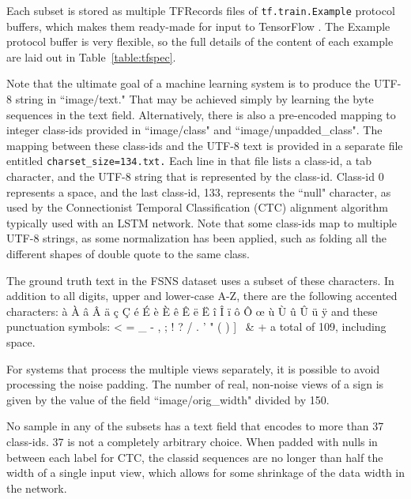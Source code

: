 \documentclass[runningheads]{llncs}
\begin{document}
Each subset is stored as multiple TFRecords files of \texttt{tf.train.Example} protocol buffers, which makes them ready-made
 for input to TensorFlow \cite{tensorflow}\cite{abadi2016tensorflow}.
 The Example protocol buffer is very flexible, so the full details of the content of each example are laid
 out in Table~\ref{table:tfspec}.

Note that the ultimate goal of a machine learning system is to produce the UTF-8 string in ``image/text."
 That may be achieved simply by learning the byte sequences in the text field. Alternatively, there is also a
 pre-encoded mapping to integer class-ids provided in ``image/class" and ``image/unpadded\_class".
 The mapping between these class-ids and the UTF-8 text is provided in a separate file entitled
 \texttt{charset\_size=134.txt.} Each line in that file lists a class-id, a tab character, and the UTF-8 string
 that is represented by the class-id. Class-id 0 represents a space, and the last class-id, 133,
 represents the ``null" character, as used by the Connectionist Temporal Classification (CTC) alignment
 algorithm \cite{graves2006connectionist} typically used with an LSTM network. Note that some
 class-ids map to multiple UTF-8 strings, as some normalization has been applied, such as folding all the different shapes of double quote to the same class.

The ground truth text in the FSNS dataset uses a subset of these characters. In addition to all digits,
upper and lower-case A-Z, there are the following accented characters:
à
À
â
Â
ä
ç
Ç
é
É
è
È
ê
Ê
ë
Ë
î
Î
ï
ô
Ô
œ
ù
Ù
û
Û
ü
ÿ
and these punctuation symbols:
\textless
=
\_
-
,
;
!
?
/
.
'
"
(
)
]
\
\&
+
 a total of 109, including space.

For systems that process the multiple views separately, it is possible to avoid processing the noise padding. The number of real, non-noise views of a sign is given by the value of
the field ``image/orig\_width" divided by 150.

No sample in any of the subsets has a text field that encodes to more than 37 class-ids.
 37 is not a completely arbitrary choice. When padded with nulls in between each label for CTC,
  the classid sequences are no longer than half the width  of a single
 input view, which allows for some shrinkage of the data width in the network.
\end{document}
